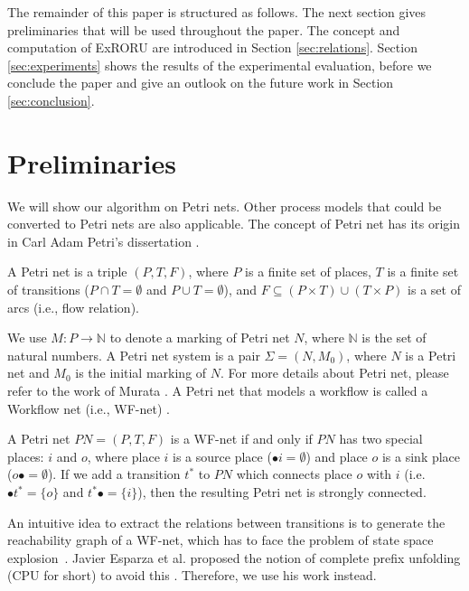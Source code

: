 \documentclass{llncs}
\begin{document}
The remainder of this paper is structured as follows. The next section gives preliminaries that will be used throughout the paper. The concept and computation of ExRORU are introduced in Section \ref{sec:relations}. Section \ref{sec:experiments} shows the results of the experimental evaluation, before we conclude the paper and give an outlook on the future work in Section \ref{sec:conclusion}.

\section{Preliminaries}\label{sec:preliminaries}
We will show our algorithm on Petri nets. Other process models that could be converted to Petri nets are also applicable. The concept of Petri net has its origin in Carl Adam Petri's dissertation \cite{petri1966kommunikation}.

\begin{definition}\label{def:petrinet}
A Petri net is a triple $(P,T,F)$, where $P$ is a finite set of places, $T$ is a finite set of transitions ($P\cap T=\emptyset$ and $P\cup T=\emptyset$), and $F\subseteq(P\times T)\cup(T\times P)$ is a set of arcs (i.e., flow relation).
\end{definition}

We use $M:P\rightarrow\mathbb{N}$ to denote a marking of Petri net $N$, where $\mathbb{N}$ is the set of natural numbers. A Petri net system is a pair $\Sigma=(N,M_{0})$, where $N$ is a Petri net and $M_{0}$ is the initial marking of $N$. For more details about Petri net, please refer to the work of Murata \cite{murata1989petri}. A Petri net that models a workflow is called a Workflow net (i.e., WF-net) \cite{van1998application}.

\begin{definition}[WF-net]\label{def:wfnet}
A Petri net $PN=(P,T,F)$ is a WF-net if and only if $PN$ has two special places: $i$ and $o$, where place $i$ is a source place ($\bullet i=\emptyset$) and place $o$ is a sink place ($o\bullet =\emptyset$). If we add a transition $t^{*}$ to $PN$ which connects place $o$ with $i$ (i.e. $\bullet t^{*}=\{o\}$ and $t^{*}\bullet=\{i\}$), then the resulting Petri net is strongly connected.
\end{definition}

An intuitive idea to extract the relations between transitions is to generate the reachability graph of a WF-net, which has to face the problem of state space explosion~\cite{mcmillan1995technique}. Javier Esparza et al. proposed the notion of complete prefix unfolding (CPU for short) to avoid this \cite{esparza2002improvement}. Therefore, we use his work instead.
\end{document}

